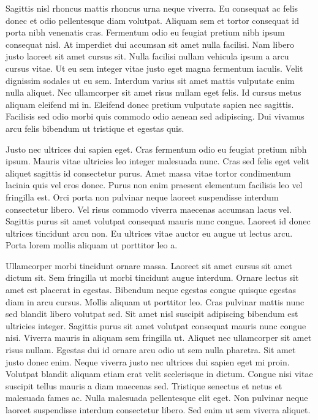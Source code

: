 \documentclass[11pt,a4paper]{article}
\begin{document}
Sagittis nisl rhoncus mattis rhoncus urna neque viverra. Eu consequat ac felis donec et odio pellentesque diam volutpat. Aliquam sem et tortor consequat id porta nibh venenatis cras. Fermentum odio eu feugiat pretium nibh ipsum consequat nisl. At imperdiet dui accumsan sit amet nulla facilisi. Nam libero justo laoreet sit amet cursus sit. Nulla facilisi nullam vehicula ipsum a arcu cursus vitae. Ut eu sem integer vitae justo eget magna fermentum iaculis. Velit dignissim sodales ut eu sem. Interdum varius sit amet mattis vulputate enim nulla aliquet. Nec ullamcorper sit amet risus nullam eget felis. Id cursus metus aliquam eleifend mi in. Eleifend donec pretium vulputate sapien nec sagittis. Facilisis sed odio morbi quis commodo odio aenean sed adipiscing. Dui vivamus arcu felis bibendum ut tristique et egestas quis.

Justo nec ultrices dui sapien eget. Cras fermentum odio eu feugiat pretium nibh ipsum. Mauris vitae ultricies leo integer malesuada nunc. Cras sed felis eget velit aliquet sagittis id consectetur purus. Amet massa vitae tortor condimentum lacinia quis vel eros donec. Purus non enim praesent elementum facilisis leo vel fringilla est. Orci porta non pulvinar neque laoreet suspendisse interdum consectetur libero. Vel risus commodo viverra maecenas accumsan lacus vel. Sagittis purus sit amet volutpat consequat mauris nunc congue. Laoreet id donec ultrices tincidunt arcu non. Eu ultrices vitae auctor eu augue ut lectus arcu. Porta lorem mollis aliquam ut porttitor leo a.

Ullamcorper morbi tincidunt ornare massa. Laoreet sit amet cursus sit amet dictum sit. Sem fringilla ut morbi tincidunt augue interdum. Ornare lectus sit amet est placerat in egestas. Bibendum neque egestas congue quisque egestas diam in arcu cursus. Mollis aliquam ut porttitor leo. Cras pulvinar mattis nunc sed blandit libero volutpat sed. Sit amet nisl suscipit adipiscing bibendum est ultricies integer. Sagittis purus sit amet volutpat consequat mauris nunc congue nisi. Viverra mauris in aliquam sem fringilla ut. Aliquet nec ullamcorper sit amet risus nullam. Egestas dui id ornare arcu odio ut sem nulla pharetra. Sit amet justo donec enim. Neque viverra justo nec ultrices dui sapien eget mi proin. Volutpat blandit aliquam etiam erat velit scelerisque in dictum. Congue nisi vitae suscipit tellus mauris a diam maecenas sed. Tristique senectus et netus et malesuada fames ac. Nulla malesuada pellentesque elit eget. Non pulvinar neque laoreet suspendisse interdum consectetur libero. Sed enim ut sem viverra aliquet.
\end{document}
